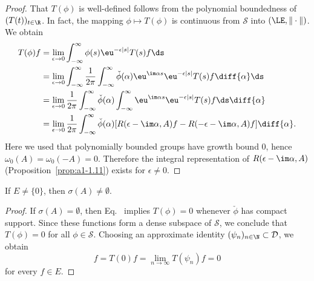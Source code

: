 \begin{proof}
That $T(\phi)$ is well-defined follows from the polynomial boundedness of\/ $(T(t))_{t\in\R}$.
In fact, the mapping $\phi \mapsto T(\phi)$ is continuous from $\mathcal{S}$ into $(\LE,\|\cdot\|)$.
We obtain
\begin{align*}
	T(\phi)f &= \lim_{\epsilon\to 0} \int_{-\infty}^{\infty} \phi(s)\eu^{-\epsilon|s|}T(s)f \ds \\
	&= \lim_{\epsilon\to 0} \int_{-\infty}^{\infty} \frac{1}{2\pi}\int_{-\infty}^{\infty} \check{\phi}(\alpha)\eu^{\im\alpha s}\eu^{-\epsilon|s|}T(s)f \diff{\alpha} \ds \\
	&= \lim_{\epsilon\to 0} \frac{1}{2\pi}\int_{-\infty}^{\infty} \check{\phi}(\alpha)\int_{-\infty}^{\infty} \eu^{\im\alpha s}\eu^{-\epsilon|s|}T(s)f \ds \diff{\alpha}\\
	&= \lim_{\epsilon\to 0} \frac{1}{2\pi}\int_{-\infty}^{\infty} \check{\phi}(\alpha)[R(\epsilon-\im\alpha,A)f - R(-\epsilon-\im\alpha,A)f] \diff{\alpha}  .
\end{align*}
Here we used that polynomially bounded groups have growth bound $0$, hence $\omega_{0}(A) = \omega_{0}(-A) = 0$.
Therefore the integral representation of\/ $R(\epsilon-\im\alpha,A)$ (\cf Proposition~\ref{prop:a1-1.11}) exists for $\epsilon \neq 0$.
\end{proof}
\begin{lemma}\label{lem:a3-7.6}
If\/ $E \neq \{0\}$, then $\sigma(A) \neq \emptyset$.
\end{lemma}
\begin{proof}
If\/ $\sigma(A) = \emptyset$, then Eq.~ implies $T(\phi) = 0$ whenever $\check{\phi}$ has compact support.
Since these functions form a dense subspace of\/ $\mathcal{S}$, we conclude that $T(\phi) = 0$ for all $\phi \in \mathcal{S}$.
Choosing an approximate identity $(\psi_{n})_{n\in\N} \subset \mathcal{D}$, we obtain
\[
f = T(0)f = \lim_{n\to\infty} T(\psi_{n})f = 0
\]
for every $f \in E$.
\end{proof}
